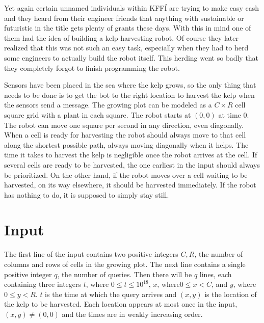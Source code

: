 
Yet again certain unnamed individuals within KFFÍ are trying to make easy cash
and they heard from their engineer friends that anything with sustainable or
futuristic in the title gets plenty of grants these days. With this in mind
one of them had the idea of building a kelp harvesting robot. Of course they
later realized that this was not such an easy task, especially when they had
to herd some engineers to actually build the robot itself. This herding went
so badly that they completely forgot to finish programming the robot.

Sensors have been placed in the sea where the kelp grows, so the only thing
that needs to be done is to get the bot to the right location to harvest the kelp
when the sensors send a message. The growing plot can be modeled as a $C \times R$
cell square grid with a plant in each square. The robot starts at $(0, 0)$ at
time $0$. The robot can move one square per second in any direction, even
diagonally. When a cell is ready for harvesting the robot should always move
to that cell along the shortest possible path, always moving diagonally when
it helps. The time it takes to harvest the kelp is negligible once the robot
arrives at the cell. If several cells are ready to be harvested, the one
earliest in the input should always be prioritized. On the other hand, if the
robot moves over a cell waiting to be harvested, on its way elsewhere, it should
be harvested immediately. If the robot has nothing to do, it is supposed to simply
stay still.

\section*{Input}
The first line of the input contains two positive integers $C, R$,
the number of columns and rows of cells in the growing plot. The next line contains
a single positive integer $q$, the number of queries. Then there will be $q$
lines, each containing three integers $t$, where $0 \leq t \leq 10^{18}$, 
$x$, where$0 \leq x < C$, and $y$, where $0 \leq y < R$.
$t$ is the time at which the query arrives and $(x, y)$ is the
location of the kelp to be harvested. Each location appears at most once in the
input, $(x, y) \neq (0, 0)$ and the times are in weakly increasing order.

